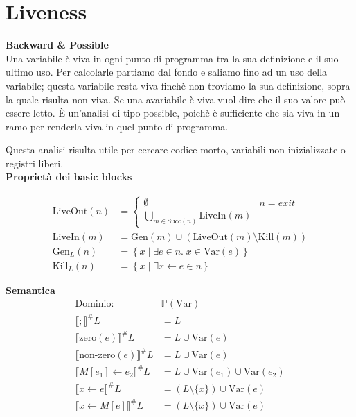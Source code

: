 \documentclass[a4paper,12pt,openany]{article}
\begin{document}
    
    \clearpage\section*{Liveness}
    \textbf{Backward \& Possible}\\[1em]
    Una variabile è viva in ogni punto di programma tra la sua definizione e il suo ultimo uso. Per calcolarle partiamo dal fondo e saliamo fino ad un uso della variabile; questa variabile resta viva finchè non troviamo la sua definizione, sopra la quale risulta non viva. Se una avariabile è viva vuol dire che il suo valore può essere letto. È un'analisi di tipo possible, poichè è sufficiente che sia viva in un ramo per renderla viva in quel punto di programma.
    
    Questa analisi risulta utile per cercare codice morto, variabili non inizializzate o registri liberi.\\[1em]
    
    \noindent\textbf{Proprietà dei basic blocks}
    
    \begin{align*}
    \mbox{LiveOut}(n) &=
    \begin{cases}
        \emptyset & n = exit\\
        \bigcup\limits_{m\in \mbox{Succ}(n)} \mbox{LiveIn}(m)
    \end{cases}\\
    \mbox{LiveIn}(m) &= \mbox{Gen}(m) \cup (\mbox{LiveOut}(m) \setminus \mbox{Kill}(m))\\
    \mbox{Gen}_{L}(n) &= \left\{
    x \;\big\vert\; \exists e \in n.\; x\in\mbox{Var}(e)
    \right\}\\
    \mbox{Kill}_{L}(n) &= \left\{
    x \;\big\vert\; \exists x\leftarrow e \in n
    \right\}
    \end{align*}
    
    \textbf{Semantica}
    \begin{align*}
    \mbox{Dominio: }& \mathbb{P}(\mbox{Var})\\
    \llbracket ; \rrbracket^\#L &= L\\
    \llbracket \mbox{zero}(e) \rrbracket^\#L &= L \cup \mbox{Var}(e)\\
    \llbracket \mbox{non-zero}(e) \rrbracket^\#L &= L \cup \mbox{Var}(e)\\
    \llbracket M[e_1]\leftarrow e_2 \rrbracket^\#L &= L \cup \mbox{Var}(e_1) \cup \mbox{Var}(e_2)\\
    \llbracket x \leftarrow e \rrbracket^\#L &= (L\setminus \{x\}) \cup \mbox{Var}(e)\\
    \llbracket x\leftarrow M[e] \rrbracket^\#L &= (L\setminus \{x\}) \cup \mbox{Var}(e)\\
    \end{align*}
    
\end{document}
